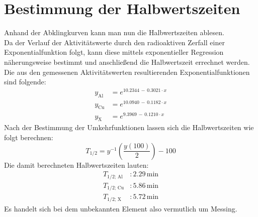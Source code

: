 \documentclass[12pt,german]{article}
\begin{document}
    \section{Bestimmung der Halbwertszeiten}
    \noindent
    Anhand der Abklingkurven kann man nun die Halbwertszeiten ablesen. \\
    Da der Verlauf der Aktivitätswerte durch den radioaktiven Zerfall einer Exponentialfunktion folgt, kann diese mittels exponentieller Regression näherungsweise bestimmt und anschließend die Halbwertszeit errechnet werden.
    Die aus den gemessenen Aktivitätswerten resultierenden Exponentialfunktionen sind folgende:
    \begin{align*}
        y_\text{Al} &= e^{10.2344\, -\, 0.3021 \cdot x} \\
        y_\text{Cu} &= e^{10.0940\, - \, 0.1182 \cdot x} \\
        y_\text{X} &= e^{9.3969\, -\, 0.1210 \cdot x}
    \end{align*}
    Nach der Bestimmung der Umkehrfunktionen lassen sich die Halbwertszeiten wie folgt berechnen:
    \begin{equation*}
        T_{1/2} = y^{-1}\left(\frac{y(100)}{2}\right) - 100
    \end{equation*}
    Die damit berechneten Halbwertszeiten lauten:
    \begin{align*}
        T_{1/2;\, \text{Al}}&: 2.29\, \text{min} \\
        T_{1/2;\, \text{Cu}}&: 5.86\, \text{min} \\
        T_{1/2;\, \text{X}}&: 5.72\, \text{min}
    \end{align*}
    Es handelt sich bei dem unbekannten Element also vermutlich um Messing.
\end{document}
